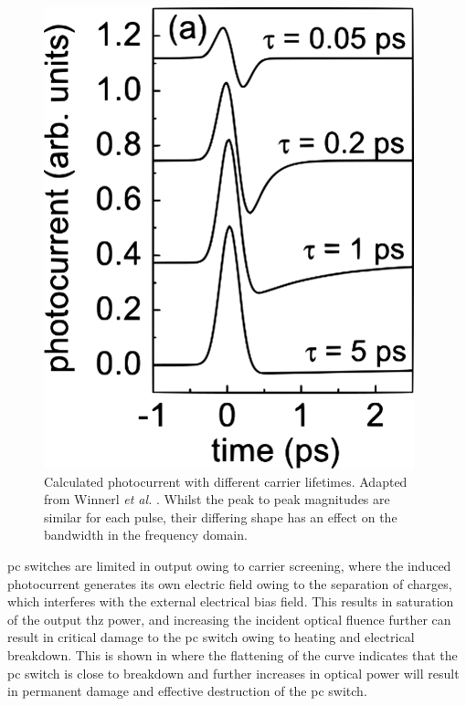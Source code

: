 \begin{figure}[t]
    \centering
    \includegraphics{Figures/Misc/Theory/PCsCarrierLifetime.png}
    \captionsetup{font = footnotesize, justification = centering}
    \caption[Calculated Photocurrent with Different Carrier Lifetimes]{Calculated photocurrent with different carrier lifetimes. Adapted from Winnerl \textit{et al.} \cite{Winnerl2008}. Whilst the peak to peak magnitudes are similar for each pulse, their differing shape has an effect on the bandwidth in the frequency domain.}
    \label{fig:PCCarrierLifetime}
\end{figure}

\acrshort{pc} switches are limited in output owing to carrier screening, where the induced photocurrent generates its own electric field owing to the separation of charges, which interferes with the external electrical bias field. This results in saturation of the output \acrshort{thz} power, and increasing the incident optical fluence further can result in critical damage to the \acrshort{pc} switch \cite{Kim2005} owing to heating and electrical breakdown. This is shown in  where the flattening of the curve indicates that the \acrshort{pc} switch is close to breakdown and further increases in optical power will result in permanent damage and effective destruction of the \acrshort{pc} switch.

